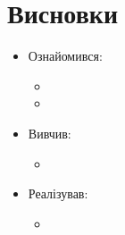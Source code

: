 \section{Висновки}
\begin{itemize}
	\item Ознайомився:
		\begin{itemize}
			\item
			\item
		\end{itemize}
	\item Вивчив:
		\begin{itemize}
			\item 
		\end{itemize}
	\item Реалізував:
		\begin{itemize}
			\item
		\end{itemize}
\end{itemize}